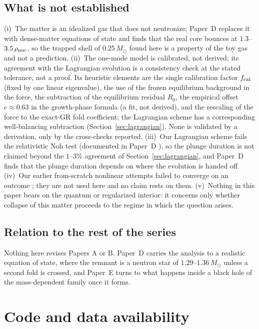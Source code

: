 \documentclass[11pt]{article}
\begin{document}
\subsection{What is not established}

(i)~The matter is an idealized gas that does not neutronize; Paper~D \citep{PaperD} replaces it with dense-matter equations of state and finds that the real core bounces at $1.3$--$3.5\,\rho_{\rm nuc}$, so the trapped shell of $0.25\,M_\odot$ found here is a property of the toy gas and not a prediction. (ii)~The one-mode model is calibrated, not derived; its agreement with the Lagrangian evolution is a consistency check at the stated tolerance, not a proof. Its heuristic elements are the single calibration factor $f_{\rm cal}$ (fixed by one linear eigenvalue), the use of the frozen equilibrium background in the force, the subtraction of the equilibrium residual $R_0$, the empirical offset $c\approx0.63$ in the growth-phase formula (a fit, not derived), and the rescaling of the force to the exact-GR fold coefficient; the Lagrangian scheme has a corresponding well-balancing subtraction (Section~\ref{sec:lagrangian}). None is validated by a derivation, only by the cross-checks reported. (iii)~Our Lagrangian scheme fails the relativistic Noh test (documented in Paper~D \citep{PaperD}), so the plunge duration is not claimed beyond the $1$--$3\%$ agreement of Section~\ref{sec:lagrangian}, and Paper~D finds that the plunge duration depends on where the evolution is handed off. (iv)~Our earlier from-scratch nonlinear attempts failed to converge on an outcome \citep{OwnbyPhase2}; they are not used here and no claim rests on them. (v)~Nothing in this paper bears on the quantum or regularized interior: it concerns only whether collapse of this matter proceeds to the regime in which the question arises.

\subsection{Relation to the rest of the series}

Nothing here revises Papers A or B. Paper~D \citep{PaperD} carries the analysis to a realistic equation of state, where the remnant is a neutron star of $1.29$--$1.36\,M_\odot$ unless a second fold is crossed, and Paper~E \citep{PaperE} turns to what happens inside a black hole of the mass-dependent family once it forms.

\section*{Code and data availability}
\end{document}
